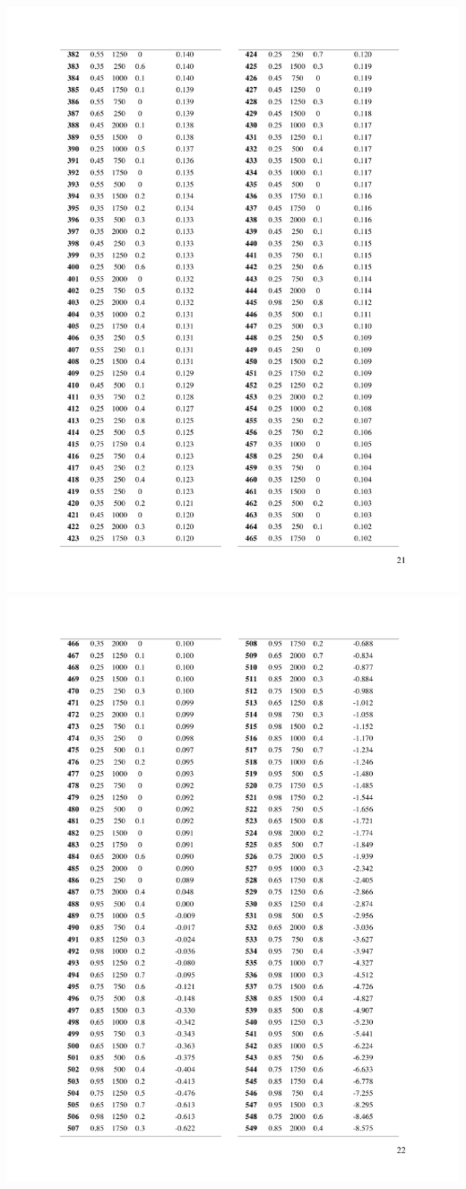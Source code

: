 \documentclass[a4paper, twoside]{templates/ociamthesis}
\begin{document}
\includegraphics[width=1\linewidth]{pdf_chapters/lights/lights_supp_crop_Part25}
\includegraphics[width=1\linewidth]{pdf_chapters/lights/lights_supp_crop_Part26}
\end{document}
